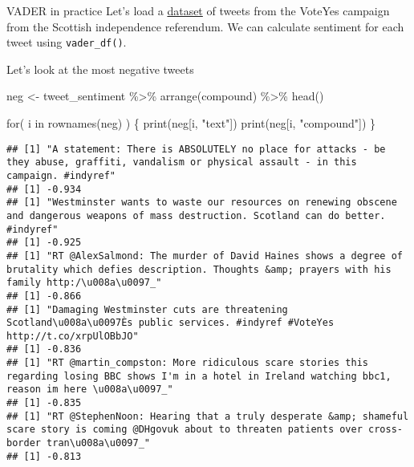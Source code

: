 \documentclass[
  10pt,
  ignorenonframetext,
  aspectratio=169]{beamer}
\newenvironment{Shaded}{\begin{snugshade}}{\end{snugshade}}
\newcommand{\ControlFlowTok}[1]{\textcolor[rgb]{0.94,0.87,0.69}{#1}}
\newcommand{\FunctionTok}[1]{\textcolor[rgb]{0.94,0.94,0.56}{#1}}
\newcommand{\NormalTok}[1]{\textcolor[rgb]{0.80,0.80,0.80}{#1}}
\newcommand{\OtherTok}[1]{\textcolor[rgb]{0.94,0.94,0.56}{#1}}
\newcommand{\SpecialCharTok}[1]{\textcolor[rgb]{0.86,0.64,0.64}{#1}}
\newcommand{\StringTok}[1]{\textcolor[rgb]{0.80,0.58,0.58}{#1}}
\begin{document}
\begin{frame}[fragile]{VADER in practice}
\protect\hypertarget{vader-in-practice-1}{}
Let's load a \href{https://doi.org/10.7910/DVN/RQ7P1F}{dataset} of
tweets from the VoteYes campaign from the Scottish independence
referendum. We can calculate sentiment for each tweet using
\texttt{vader\_df()}.

Let's look at the most negative tweets

\medskip
\scriptsize

\begin{Shaded}
\begin{Highlighting}[]
\NormalTok{neg }\OtherTok{\textless{}{-}}\NormalTok{ tweet\_sentiment }\SpecialCharTok{\%\textgreater{}\%} \FunctionTok{arrange}\NormalTok{(compound) }\SpecialCharTok{\%\textgreater{}\%} 
  \FunctionTok{head}\NormalTok{()}

\ControlFlowTok{for}\NormalTok{( i }\ControlFlowTok{in} \FunctionTok{rownames}\NormalTok{(neg) ) \{}
  \FunctionTok{print}\NormalTok{(neg[i, }\StringTok{"text"}\NormalTok{])}
  \FunctionTok{print}\NormalTok{(neg[i, }\StringTok{"compound"}\NormalTok{])}
\NormalTok{\}}
\end{Highlighting}
\end{Shaded}

\begin{verbatim}
## [1] "A statement: There is ABSOLUTELY no place for attacks - be they abuse, graffiti, vandalism or physical assault - in this campaign. #indyref"
## [1] -0.934
## [1] "Westminster wants to waste our resources on renewing obscene and dangerous weapons of mass destruction. Scotland can do better. #indyref"
## [1] -0.925
## [1] "RT @AlexSalmond: The murder of David Haines shows a degree of brutality which defies description. Thoughts &amp; prayers with his family http:/\u008a\u0097_"
## [1] -0.866
## [1] "Damaging Westminster cuts are threatening Scotland\u008a\u0097Ès public services. #indyref #VoteYes http://t.co/xrpUlOBbJO"
## [1] -0.836
## [1] "RT @martin_compston: More ridiculous scare stories this regarding losing BBC shows I'm in a hotel in Ireland watching bbc1, reason im here \u008a\u0097_"
## [1] -0.835
## [1] "RT @StephenNoon: Hearing that a truly desperate &amp; shameful scare story is coming @DHgovuk about to threaten patients over cross-border tran\u008a\u0097_"
## [1] -0.813
\end{verbatim}
\end{frame}
\end{document}
